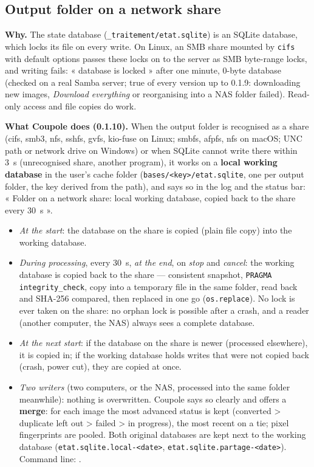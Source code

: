 \subsection{Output folder on a network share}\label{sec:partage}
\textbf{Why.} The state database (\texttt{\_traitement/etat.sqlite}) is an SQLite database, which locks its file on
every write. On Linux, an SMB share mounted by \texttt{cifs} with default options passes these locks on to the
server as SMB byte-range locks, and writing fails: « database is locked » after one minute, 0-byte database (checked
on a real Samba server; true of every version up to 0.1.9: downloading new images, \emph{Download everything} or
reorganising into a NAS folder failed). Read-only access and file copies do work.

\textbf{What Coupole does (0.1.10).} When the output folder is recognised as a share (cifs, smb3, nfs, sshfs, gvfs,
kio-fuse on Linux; smbfs, afpfs, nfs on macOS; UNC path or network drive on Windows) or when SQLite cannot write
there within 3~s (unrecognised share, another program), it works on a \textbf{local working database} in the user's
cache folder (\texttt{bases/<key>/etat.sqlite}, one per output folder, the key derived from the path), and says so
in the log and the status bar: « Folder on a network share: local working database, copied back to the share every
30~s ».
\begin{itemize}[nosep]
\item \emph{At the start}: the database on the share is copied (plain file copy) into the working database.
\item \emph{During processing}, every 30~s, \emph{at the end}, on \emph{stop} and \emph{cancel}: the working database
  is copied back to the share --- consistent snapshot, \texttt{PRAGMA integrity\_check}, copy into a temporary file
  in the same folder, read back and SHA-256 compared, then replaced in one go (\texttt{os.replace}). No lock is ever
  taken on the share: no orphan lock is possible after a crash, and a reader (another computer, the NAS) always sees
  a complete database.
\item \emph{At the next start}: if the database on the share is newer (processed elsewhere), it is copied in; if the
  working database holds writes that were not copied back (crash, power cut), they are copied at once.
\item \emph{Two writers} (two computers, or the NAS, processed into the same folder meanwhile): nothing is
  overwritten. Coupole says so clearly and offers a \textbf{merge}: for each image the most advanced status is kept
  (converted > duplicate left out > failed > in progress), the most recent on a tie; pixel fingerprints are pooled.
  Both original databases are kept next to the working database (\texttt{etat.sqlite.local-<date>},
  \texttt{etat.sqlite.partage-<date>}). Command line: .
\end{itemize}
